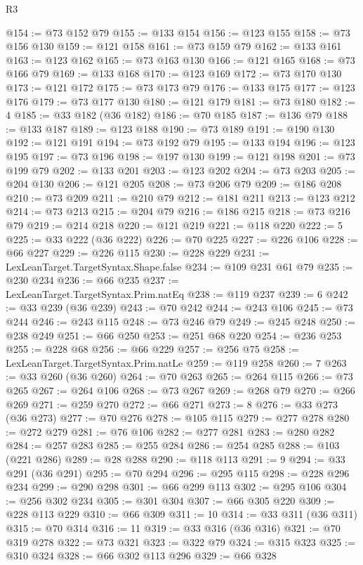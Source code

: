 \begin{lexlean}{R3}
\begin{coremodule}
@154 := @73 @152 @79
@155 := @133 @154
@156 := @123 @155
@158 := @73 @156 @130
@159 := @121 @158
@161 := @73 @159 @79
@162 := @133 @161
@163 := @123 @162
@165 := @73 @163 @130
@166 := @121 @165
@168 := @73 @166 @79
@169 := @133 @168
@170 := @123 @169
@172 := @73 @170 @130
@173 := @121 @172
@175 := @73 @173 @79
@176 := @133 @175
@177 := @123 @176
@179 := @73 @177 @130
@180 := @121 @179
@181 := @73 @180
@182 := 4
@185 := @33 @182 (@36 @182)
@186 := @70 @185
@187 := @136 @79
@188 := @133 @187
@189 := @123 @188
@190 := @73 @189
@191 := @190 @130
@192 := @121 @191
@194 := @73 @192 @79
@195 := @133 @194
@196 := @123 @195
@197 := @73 @196
@198 := @197 @130
@199 := @121 @198
@201 := @73 @199 @79
@202 := @133 @201
@203 := @123 @202
@204 := @73 @203
@205 := @204 @130
@206 := @121 @205
@208 := @73 @206 @79
@209 := @186 @208
@210 := @73 @209
@211 := @210 @79
@212 := @181 @211
@213 := @123 @212
@214 := @73 @213
@215 := @204 @79
@216 := @186 @215
@218 := @73 @216 @79
@219 := @214 @218
@220 := @121 @219
@221 := @118 @220
@222 := 5
@225 := @33 @222 (@36 @222)
@226 := @70 @225
@227 := @226 @106
@228 := @66 @227
@229 := @226 @115
@230 := @228 @229
@231 := LexLeanTarget.TargetSyntax.Shape.false
@234 := @109 @231 @61 @79
@235 := @230 @234
@236 := @66 @235
@237 := LexLeanTarget.TargetSyntax.Prim.natEq
@238 := @119 @237
@239 := 6
@242 := @33 @239 (@36 @239)
@243 := @70 @242
@244 := @243 @106
@245 := @73 @244
@246 := @243 @115
@248 := @73 @246 @79
@249 := @245 @248
@250 := @238 @249
@251 := @66 @250
@253 := @251 @68 @220
@254 := @236 @253
@255 := @228 @68
@256 := @66 @229
@257 := @256 @75
@258 := LexLeanTarget.TargetSyntax.Prim.natLe
@259 := @119 @258
@260 := 7
@263 := @33 @260 (@36 @260)
@264 := @70 @263
@265 := @264 @115
@266 := @73 @265
@267 := @264 @106
@268 := @73 @267
@269 := @268 @79
@270 := @266 @269
@271 := @259 @270
@272 := @66 @271
@273 := 8
@276 := @33 @273 (@36 @273)
@277 := @70 @276
@278 := @105 @115
@279 := @277 @278
@280 := @272 @279
@281 := @76 @106
@282 := @277 @281
@283 := @280 @282
@284 := @257 @283
@285 := @255 @284
@286 := @254 @285
@288 := @103 (@221 @286)
@289 := @28 @288
@290 := @118 @113
@291 := 9
@294 := @33 @291 (@36 @291)
@295 := @70 @294
@296 := @295 @115
@298 := @228 @296 @234
@299 := @290 @298
@301 := @66 @299 @113
@302 := @295 @106
@304 := @256 @302 @234
@305 := @301 @304
@307 := @66 @305 @220
@309 := @228 @113 @229
@310 := @66 @309
@311 := 10
@314 := @33 @311 (@36 @311)
@315 := @70 @314
@316 := 11
@319 := @33 @316 (@36 @316)
@321 := @70 @319 @278
@322 := @73 @321
@323 := @322 @79
@324 := @315 @323
@325 := @310 @324
@328 := @66 @302 @113 @296
@329 := @66 @328

\end{coremodule}
\end{lexlean}
